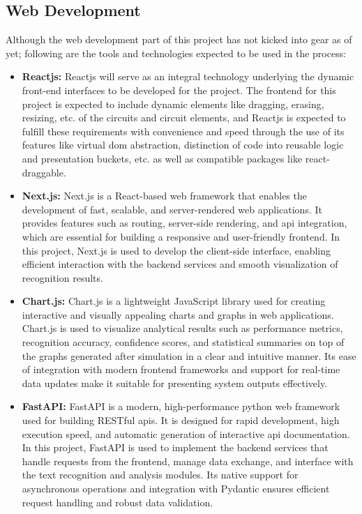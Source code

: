 \subsection{Web Development}

Although the web development part of this project has not kicked into gear as of yet; following are the tools and technologies expected to be used in the process:

\begin{itemize}
    \item \textbf{Reactjs:} Reactjs will serve as an integral technology underlying the dynamic front-end interfaces to be developed for the project. The frontend for this project is expected to include dynamic elements like dragging, erasing, resizing, etc. of the circuits and circuit elements, and Reactjs is expected to fulfill these requirements with convenience and speed through the use of its features like virtual \gls{dom} abstraction, distinction of code into reusable logic and presentation buckets, etc. as well as compatible packages like react-draggable.
    
    \item \textbf{Next.js:} Next.js is a React-based web framework that enables the development of fast, scalable, and server-rendered web applications. It provides features such as routing, server-side rendering, and \gls{api} integration, which are essential for building a responsive and user-friendly frontend. In this project, Next.js is used to develop the client-side interface, enabling efficient interaction with the backend services and smooth visualization of recognition results.
    
    \item \textbf{Chart.js:} Chart.js is a lightweight JavaScript library used for creating interactive and visually appealing charts and graphs in web applications. Chart.js is used to visualize analytical results such as performance metrics, recognition accuracy, confidence scores, and statistical summaries on top of the graphs generated after simulation in a clear and intuitive manner. Its ease of integration with modern frontend frameworks and support for real-time data updates make it suitable for presenting system outputs effectively.
    
    \item \textbf{FastAPI:} FastAPI is a modern, high-performance \gls{python} web framework used for building RESTful \glspl{api}. It is designed for rapid development, high execution speed, and automatic generation of interactive \gls{api} documentation. In this project, FastAPI is used to implement the backend services that handle requests from the frontend, manage data exchange, and interface with the text recognition and analysis modules. Its native support for asynchronous operations and integration with Pydantic ensures efficient request handling and robust data validation.
    

\end{itemize}
